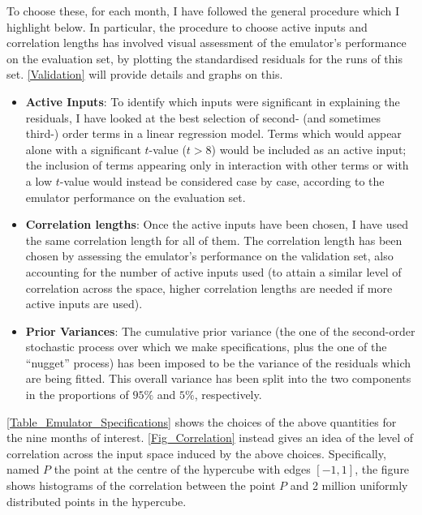 \documentclass[a4paper, 12pt]{article}
\begin{document}
To choose these, for each month, I have followed the general procedure which I highlight below. In particular, the procedure to choose active inputs and correlation lengths has involved visual assessment of the emulator's performance on the evaluation set, by plotting the standardised residuals for the runs of this set. \autoref{Validation} will provide details and graphs on this. 

\begin{itemize}
\item {\bf Active Inputs}: To identify which inputs were significant in explaining the residuals, I have looked at the best selection of second- (and sometimes third-) order terms in a linear regression model. 
Terms which would appear alone with a significant $t$-value ($t>8$) would be included as an active input; the inclusion of terms appearing only in interaction with other terms or with a low $t$-value would instead be considered case by case, according to the emulator performance on the evaluation set.
\item {\bf Correlation lengths}: Once the active inputs have been chosen, I have used the same correlation length for all of them. The correlation length has been chosen by assessing the emulator's performance on the validation set, also accounting for the number of active inputs used
(to attain a similar level of correlation across the space, higher correlation lengths are needed if more active inputs are used).
\item {\bf Prior Variances}: The cumulative prior variance (the one of the second-order stochastic process over which we make specifications, plus the one of the ``nugget'' process) has been imposed to be the variance of the residuals which are being fitted. This overall variance has been split into the two components in the proportions of $95\%$ and $5\%$, respectively.
\end{itemize}

\autoref{Table_Emulator_Specifications} shows the choices of the above quantities for the nine months of interest.
\autoref{Fig_Correlation} instead gives an idea
 of the level of correlation across the input space induced by the above choices. Specifically, named $P$ the point at the centre of the hypercube with edges $[-1,1]$, the figure shows histograms of the correlation between the point $P$ and 2 million uniformly distributed points in the hypercube.
\end{document}
